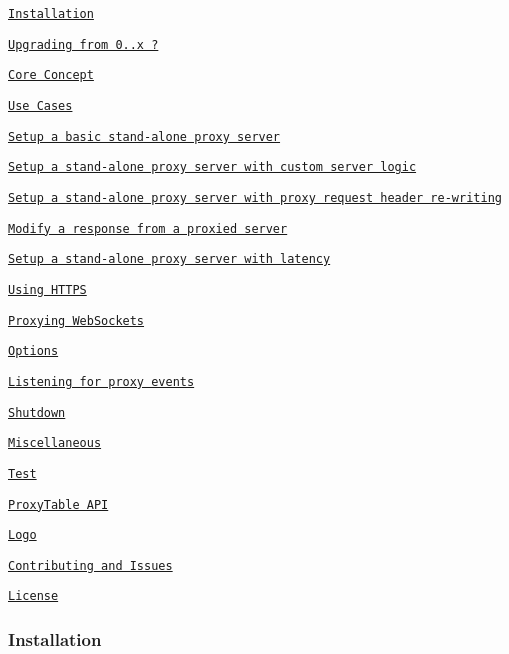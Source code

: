 \begin{DoxyItemize}
\item \href{#installation}{\tt Installation}
\item \href{#upgrading-from-08x-}{\tt Upgrading from 0..\+x ?}
\item \href{#core-concept}{\tt Core Concept}
\item \href{#use-cases}{\tt Use Cases}
\begin{DoxyItemize}
\item \href{#setup-a-basic-stand-alone-proxy-server}{\tt Setup a basic stand-\/alone proxy server}
\item \href{#setup-a-stand-alone-proxy-server-with-custom-server-logic}{\tt Setup a stand-\/alone proxy server with custom server logic}
\item \href{#setup-a-stand-alone-proxy-server-with-proxy-request-header-re-writing}{\tt Setup a stand-\/alone proxy server with proxy request header re-\/writing}
\item \href{#modify-a-response-from-a-proxied-server}{\tt Modify a response from a proxied server}
\item \href{#setup-a-stand-alone-proxy-server-with-latency}{\tt Setup a stand-\/alone proxy server with latency}
\item \href{#using-https}{\tt Using H\+T\+T\+PS}
\item \href{#proxying-websockets}{\tt Proxying Web\+Sockets}
\end{DoxyItemize}
\item \href{#options}{\tt Options}
\item \href{#listening-for-proxy-events}{\tt Listening for proxy events}
\item \href{#shutdown}{\tt Shutdown}
\item \href{#miscellaneous}{\tt Miscellaneous}
\begin{DoxyItemize}
\item \href{#test}{\tt Test}
\item \href{#proxytable-api}{\tt Proxy\+Table A\+PI}
\item \href{#logo}{\tt Logo}
\end{DoxyItemize}
\item \href{#contributing-and-issues}{\tt Contributing and Issues}
\item \href{#license}{\tt License}
\end{DoxyItemize}

\subsubsection*{Installation}

